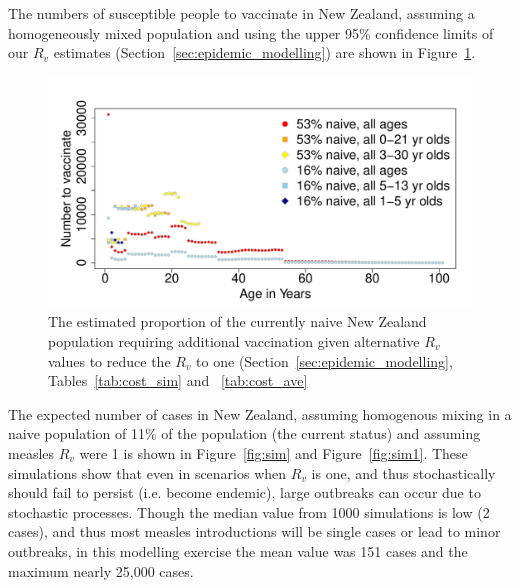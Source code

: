 \documentclass{article}
\begin{document}
The numbers of susceptible people to vaccinate in New Zealand, assuming a homogeneously mixed population and using the upper 95\% confidence limits of our $R_v$ estimates (Section~\ref{sec:epidemic_modelling}) are shown in Figure~\ref{fig:numvac}.


\begin{figure}
     \centering
\includegraphics{interimreport2-035}
     \caption{The estimated proportion of the currently naive New Zealand population requiring additional vaccination given alternative $R_v$ values to reduce the $R_v$ to one (Section~\ref{sec:epidemic_modelling}, Tables~\ref{tab:cost_sim} and ~\ref{tab:cost_ave}}
     \label{fig:numvac}
\end{figure}

The expected number of cases in New Zealand, assuming homogenous mixing in a naive population of 11\% of the population (the current status) and assuming measles $R_v$ were 1 is shown in Figure~\ref{fig:sim} and Figure~\ref{fig:sim1}. These simulations show that even in scenarios when $R_v$ is one, and thus stochastically should fail to persist (i.e. become endemic), large outbreaks can occur due to stochastic processes. Though the median value from 1000 simulations is low (2 cases), and thus most measles introductions will be single cases or lead to minor outbreaks, in this modelling exercise the mean value was 151 cases and the maximum nearly 25,000 cases.
\end{document}
